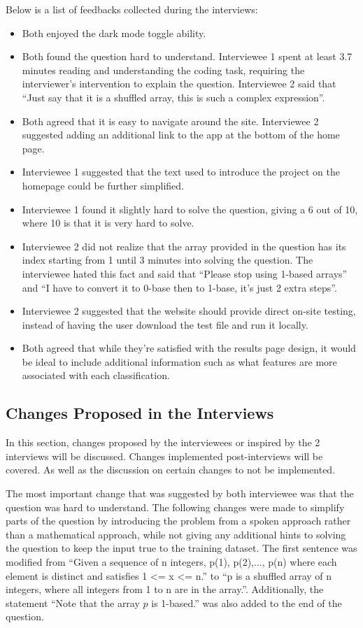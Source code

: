 \documentclass{report}
\begin{document}
Below is a list of feedbacks collected during the interviews:

\begin{itemize}
\item Both enjoyed the dark mode toggle ability.
\item Both found the question hard to understand. Interviewee 1 spent at least 3.7 minutes reading and understanding the coding task, requiring the interviewer’s intervention to explain the question. Interviewee 2 said that “Just say that it is a shuffled array, this is such a complex expression”.
\item Both agreed that it is easy to navigate around the site. Interviewee 2 suggested adding an additional link to the app at the bottom of the home page.
\item Interviewee 1 suggested that the text used to introduce the project on the homepage could be further simplified.
\item Interviewee 1 found it slightly hard to solve the question, giving a 6 out of 10, where 10 is that it is very hard to solve.
\item Interviewee 2 did not realize that the array provided in the question has its index starting from 1 until 3 minutes into solving the question. The interviewee hated this fact and said that “Please stop using 1-based arrays” and “I have to convert it to 0-base then to 1-base, it’s just 2 extra steps”.
\item Interviewee 2 suggested that the website should provide direct on-site testing, instead of having the user download the test file and run it locally.
\item Both agreed that while they’re satisfied with the results page design, it would be ideal to include additional information such as what features are more associated with each classification.
\end{itemize}

\subsection{Changes Proposed in the Interviews}

In this section, changes proposed by the interviewees or inspired by the 2 interviews will be discussed. Changes implemented post-interviews will be covered. As well as the discussion on certain changes to not be implemented.

The most important change that was suggested by both interviewee was that the question was hard to understand. The following changes were made to simplify parts of the question by introducing the problem from a spoken approach rather than a mathematical approach, while not giving any additional hints to solving the question to keep the input true to the training dataset. The first sentence was modified from “Given a sequence of n integers, p(1), p(2),..., p(n) where each element is distinct and satisfies 1 <= x <= n.” to “p is a shuffled array of n integers, where all integers from 1 to n are in the array.”. Additionally, the statement “Note that the array $p$ is 1-based.” was also added to the end of the question.
\end{document}
